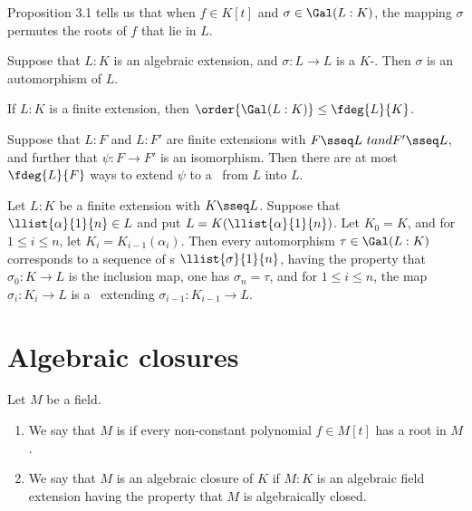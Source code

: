 \documentclass{article}
\begin{document}
  \quad Proposition 3.1 tells us that when $ f\in K[t] $ and $ \sigma\in \Gal(L:K) $, the mapping $ \sigma $ permutes the roots of $ f $ that lie in $ L $.

  \begin{ttheorem}
    Suppose that $ L:K $ is an algebraic extension, and $ \sigma:L\to L $ is a $ K $-\homo.
    Then $ \sigma $ is an automorphism of $ L $.
  \end{ttheorem}

  \begin{ttheorem}
    If $ L:K $ is a finite extension, then $ \order{\Gal(L:K)}\leq \fdeg{L}{K} $.
  \end{ttheorem}

  \begin{tcorollary}
    Suppose that $ L:F $ and $ L:F' $ are finite extensions with $ F\sseq L\ tand F'\sseq L $, and further that $ \psi:F\to F' $ is an isomorphism.
    Then there are at most $ \fdeg{L}{F} $ ways to extend $ \psi $ to a \homo~from $ L $ into $ L $.
  \end{tcorollary}

  \begin{tcorollary}
    Let $ L:K $ be a finite extension with $ K\sseq L $.
    Suppose that $ \llist{\alpha}{1}{n}\in L $ and put $ L=K(\llist{\alpha}{1}{n}) $.
    Let $ K_0 = K $, and for $ 1\leq i\leq n $, let $ K_i = K_{i-1}(\alpha_i) $.
    Then every automorphism $ \tau \in \Gal(L:K) $ corresponds to a sequence of \homo s $ \llist{\sigma}{1}{n} $, having the property that $ \sigma_0:K\to L $ is the inclusion map, one has $ \sigma_n=\tau $, and for $ 1\leq i\leq n $, the map $ \sigma_i : K_i\to L $ is a \homo~extending $ \sigma_{i-1}:K_{i-1}\to L $.
  \end{tcorollary}

\section{Algebraic closures}
  \begin{tdefinition}
    Let $ M $ be a field.
    \begin{enumerate}[label=(\roman*)]
      \item We say that $ M $ is  if every non-constant polynomial $ f\in M[t] $ has a root in $ M $.
      \item We say that $ M $ is an algebraic closure of $ K $ if $ M:K $ is an algebraic field extension having the property that $ M $ is algebraically closed.
    \end{enumerate}
  \end{tdefinition}
\end{document}
